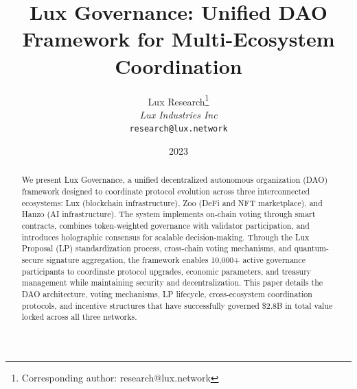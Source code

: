 \documentclass[11pt,a4paper]{article}
\title{Lux Governance: Unified DAO Framework for Multi-Ecosystem Coordination}
\author{
Lux Research\thanks{Corresponding author: research@lux.network}\\
\textit{Lux Industries Inc}\\
\texttt{research@lux.network}
}
\date{2023}
\begin{document}
\luxcoverpage
\begin{abstract}
We present Lux Governance, a unified decentralized autonomous organization (DAO) framework designed to coordinate protocol evolution across three interconnected ecosystems: Lux (blockchain infrastructure), Zoo (DeFi and NFT marketplace), and Hanzo (AI infrastructure). The system implements on-chain voting through smart contracts, combines token-weighted governance with validator participation, and introduces holographic consensus for scalable decision-making. Through the Lux Proposal (LP) standardization process, cross-chain voting mechanisms, and quantum-secure signature aggregation, the framework enables 10,000+ active governance participants to coordinate protocol upgrades, economic parameters, and treasury management while maintaining security and decentralization. This paper details the DAO architecture, voting mechanisms, LP lifecycle, cross-ecosystem coordination protocols, and incentive structures that have successfully governed \$2.8B in total value locked across all three networks.
\end{abstract}



















\end{document}
